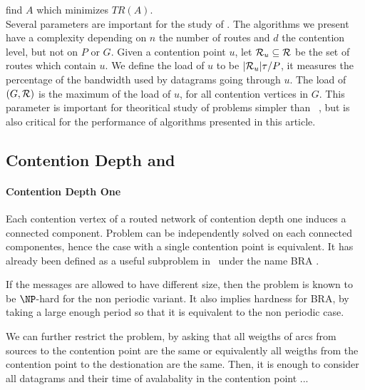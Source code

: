 \documentclass[english]{article}
\begin{document}
       find $A$ which minimizes $TR(A)$.
      \\
    
    Several parameters are important for the study of \spall. The algorithms we present have a complexity
    depending on $n$ the number of routes and $d$ the contention level, but not on $P$ or $G$.
    Given a contention point $u$, let ${\cal R}_u \subseteq {\cal R}$ be the set of routes which contain $u$. We define the load of $u$ to be $|{\cal R}_u|\tau/P$, it measures the percentage of the bandwidth used by datagrams
    going through $u$. The load of $(G,{\cal R})$ is the maximum of the load of $u$, for all contention vertices in $G$.
    This parameter is important for theoritical study of problems simpler than \spall~\cite{}, but is also critical 
    for the performance of algorithms presented in this article.


\subsection{Contention Depth and \spall}

\paragraph*{Contention Depth One}

Each contention vertex of a routed network of contention depth one induces a connected component. 
Problem \spall can be independently solved on each connected componentes, hence the case with a single contention point
is equivalent. It has already been defined as a useful subproblem in~\cite{} under the name BRA .


If the messages are allowed to have different size, then the problem is known to be $\NP$-hard for the non periodic variant.
It also implies hardness for BRA, by taking a large enough period so that it is equivalent to the non periodic case.

We can further restrict the problem, by asking that all weigths of arcs from sources to the contention point
are the same or equivalently all weigths from the contention point to the destionation are the same. 
Then, it is enough to consider all datagrams and their time of avalabality in the contention point ...
\end{document}
